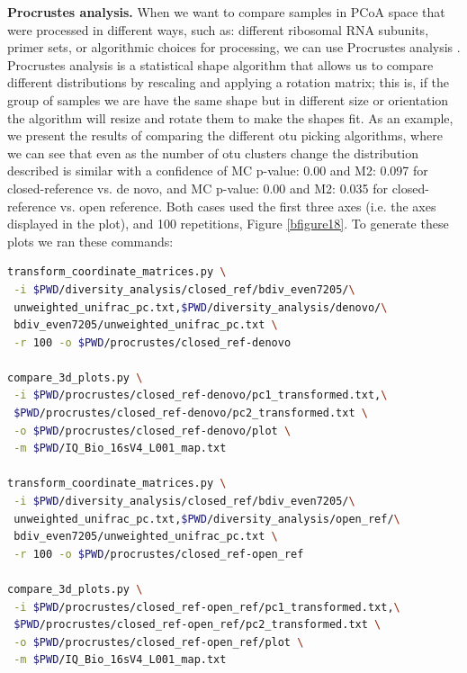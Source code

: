 \textbf{Procrustes analysis.} When we want to compare samples in PCoA space that
were processed in different ways, such as: different ribosomal RNA subunits, primer sets,
or algorithmic choices for processing, we can use Procrustes analysis \cite{Gower1966, Muegge2011, Vinten2011}.
Procrustes analysis is a statistical shape algorithm that allows us to compare different distributions by
rescaling and applying a rotation matrix; this is, if the group of samples we are have the same shape but
in different size or orientation the algorithm will resize and rotate them to make the shapes fit. As an example,
we present the results of comparing the different \gls{otu} picking algorithms, where we can see that even as the number
of \gls{otu} clusters change the distribution described is similar with a confidence of MC p-value: 0.00 and M2: 0.097 for
closed-reference vs. de novo, and MC p-value: 0.00 and M2: 0.035 for closed-reference vs. open reference.
Both cases used the first three axes (i.e. the axes displayed in the plot), and 100 repetitions, Figure \ref{bfigure18}.
To generate these plots we ran these commands:

\begin{lstlisting}[language=bash]
transform_coordinate_matrices.py \
 -i $PWD/diversity_analysis/closed_ref/bdiv_even7205/\
 unweighted_unifrac_pc.txt,$PWD/diversity_analysis/denovo/\
 bdiv_even7205/unweighted_unifrac_pc.txt \
 -r 100 -o $PWD/procrustes/closed_ref-denovo

compare_3d_plots.py \
 -i $PWD/procrustes/closed_ref-denovo/pc1_transformed.txt,\
 $PWD/procrustes/closed_ref-denovo/pc2_transformed.txt \
 -o $PWD/procrustes/closed_ref-denovo/plot \
 -m $PWD/IQ_Bio_16sV4_L001_map.txt

transform_coordinate_matrices.py \
 -i $PWD/diversity_analysis/closed_ref/bdiv_even7205/\
 unweighted_unifrac_pc.txt,$PWD/diversity_analysis/open_ref/\
 bdiv_even7205/unweighted_unifrac_pc.txt \
 -r 100 -o $PWD/procrustes/closed_ref-open_ref

compare_3d_plots.py \
 -i $PWD/procrustes/closed_ref-open_ref/pc1_transformed.txt,\
 $PWD/procrustes/closed_ref-open_ref/pc2_transformed.txt \
 -o $PWD/procrustes/closed_ref-open_ref/plot \
 -m $PWD/IQ_Bio_16sV4_L001_map.txt
\end{lstlisting}

